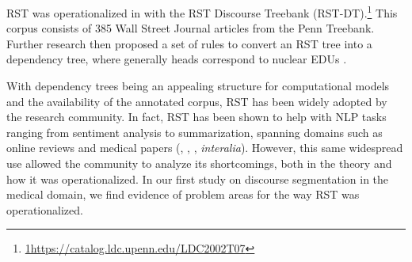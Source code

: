 
RST was operationalized in  with the RST Discourse Treebank (RST-DT).\footnote{\url{1https://catalog.ldc.upenn.edu/LDC2002T07}} This corpus consists of 385 Wall Street Journal articles from the Penn Treebank. Further research then proposed a set of rules to convert an RST tree into a dependency tree, where generally heads correspond to nuclear EDUs \cite{Hirao:2013}. 

With dependency trees being an appealing structure for computational models and the availability of the annotated corpus, RST has been widely adopted by the research community. In fact, RST has been shown to help with NLP tasks ranging from sentiment analysis to summarization, spanning domains such as online reviews and medical papers (, , , \textit{interalia}). However, this same widespread use allowed the community to analyze its shortcomings, both in the theory and how it was operationalized. In our first study on discourse segmentation in the medical domain, we find evidence of problem areas for the way RST was operationalized.


